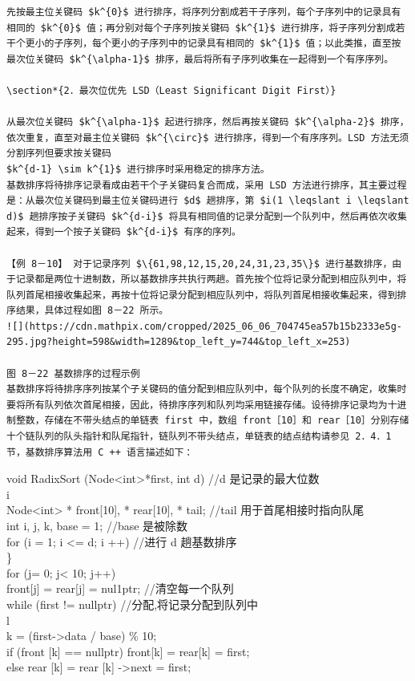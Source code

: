\documentclass[10pt]{article}
\begin{document}
\begin{verbatim}
先按最主位关键码 $k^{0}$ 进行排序，将序列分割成若干子序列，每个子序列中的记录具有相同的 $k^{0}$ 值；再分别对每个子序列按关键码 $k^{1}$ 进行排序，将子序列分割成若干个更小的子序列，每个更小的子序列中的记录具有相同的 $k^{1}$ 值；以此类推，直至按最次位关键码 $k^{\alpha-1}$ 排序，最后将所有子序列收集在一起得到一个有序序列。

\section*{2．最次位优先 LSD（Least Significant Digit First）}

从最次位关键码 $k^{\alpha-1}$ 起进行排序，然后再按关键码 $k^{\alpha-2}$ 排序，依次重复，直至对最主位关键码 $k^{\circ}$ 进行排序，得到一个有序序列。LSD 方法无须分割序列但要求按关键码
$k^{d-1} \sim k^{1}$ 进行排序时采用稳定的排序方法。
基数排序将待排序记录看成由若干个子关键码复合而成，采用 LSD 方法进行排序，其主要过程是：从最次位关键码到最主位关键码进行 $d$ 趟排序，第 $i(1 \leqslant i \leqslant d)$ 趟排序按子关键码 $k^{d-i}$ 将具有相同值的记录分配到一个队列中，然后再依次收集起来，得到一个按子关键码 $k^{d-i}$ 有序的序列。

【例 8－10】 对于记录序列 $\{61,98,12,15,20,24,31,23,35\}$ 进行基数排序，由于记录都是两位十进制数，所以基数排序共执行两趟。首先按个位将记录分配到相应队列中，将队列首尾相接收集起来，再按十位将记录分配到相应队列中，将队列首尾相接收集起来，得到排序结果，具体过程如图 8－22 所示。
![](https://cdn.mathpix.com/cropped/2025_06_06_704745ea57b15b2333e5g-295.jpg?height=598&width=1289&top_left_y=744&top_left_x=253)

图 8－22 基数排序的过程示例
基数排序将待排序序列按某个子关键码的值分配到相应队列中，每个队列的长度不确定，收集时要将所有队列依次首尾相接，因此，待排序序列和队列均采用链接存储。设待排序记录均为十进制整数，存储在不带头结点的单链表 first 中，数组 front［10］和 rear［10］分别存储十个链队列的队头指针和队尾指针，链队列不带头结点，单链表的结点结构请参见 2．4．1节，基数排序算法用 C ++ 语言描述如下：
\end{verbatim}

void RadixSort (Node<int>*first, int d) //d 是记录的最大位数\\
i\\
Node<int> * front[10], * rear[10], * tail; //tail 用于首尾相接时指向队尾\\
int i, j, k, base = 1; //base 是被除数\\
for (i = 1; i <= d; i ++) //进行 d 趟基数排序\\
\}\\
for (j= 0; j< 10; j++)\\[0pt]
front[j] = rear[j] = nul1ptr; //清空每一个队列\\
while (first != nullptr) //分配,将记录分配到队列中\\
l\\
k = (first->data / base) \% 10;\\[0pt]
if (front [k] == nullptr) front[k] = rear[k] = first;\\[0pt]
else rear [k] = rear [k] ->next = first;
\end{document}
